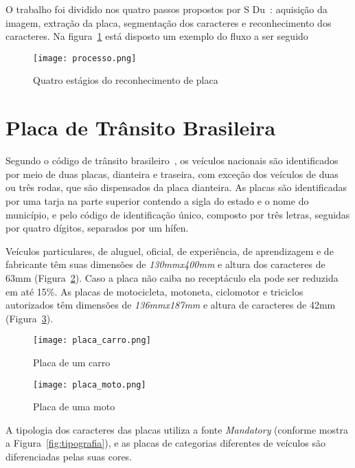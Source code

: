 O trabalho foi dividido nos quatro passos propostos por S
Du~\cite{s2013automatic}: aquisição da imagem, extração da placa, segmentação
dos caracteres e reconhecimento dos caracteres. Na figura~\ref{fig:processo}
está disposto um exemplo do fluxo a ser seguido

\begin{figure}[H]
	\centering
	\texttt{[image: processo.png]}
	\caption{Quatro estágios do reconhecimento de placa}
	\label{fig:processo}
\end{figure}

\section{Placa de Trânsito Brasileira}
\label{sec:placabr}

Segundo o código de trânsito brasileiro~\cite{brasil1997lei}, os veículos
nacionais são identificados por meio de duas placas, dianteira e traseira, com
exceção dos veículos de duas ou três rodas, que são dispensados da placa
dianteira. As placas são identificadas por uma tarja na parte superior contendo
a sigla do estado e o nome do município, e pelo código de identificação único,
composto por três letras, seguidas por quatro dígitos, separados por um hífen.

Veículos particulares, de aluguel, oficial, de experiência, de aprendizagem e de
fabricante têm suas dimensões de \emph{130mmx400mm} e altura dos caracteres de
63mm (Figura~\ref{fig:placa_carro}).  Caso a placa não caiba no receptáculo ela
pode ser reduzida em até 15\%. As placas de motocicleta, motoneta, ciclomotor e
triciclos autorizados têm dimensões de \emph{136mmx187mm} e altura de caracteres
de 42mm (Figura~\ref{fig:placa_moto}).

\begin{figure}[H]
	\centering
	\texttt{[image: placa\_carro.png]}
	\caption{Placa de um carro}
	\label{fig:placa_carro}
\end{figure}

\begin{figure}[H]
	\centering
	\texttt{[image: placa\_moto.png]}
	\caption{Placa de uma moto}
	\label{fig:placa_moto}
\end{figure}

A tipologia dos caracteres das placas utiliza a fonte \emph{Mandatory} (conforme
mostra a Figura~\ref{fig:tipografia}), e as placas de categorias diferentes de
veículos são diferenciadas pelas suas cores.

